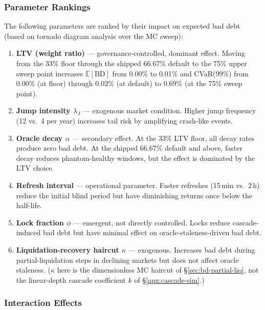 \documentclass[10pt,a4paper,twocolumn]{article}
\begin{document}
\subsubsection{Parameter Rankings}
\label{subsec:bd-tornado}

The following parameters are ranked by their impact on expected bad debt (based on tornado diagram analysis over the MC sweep):

\begin{enumerate}[leftmargin=*]
\item \textbf{LTV (weight ratio)} --- governance-controlled, dominant effect. Moving from the 33\% floor through the shipped 66.67\% default to the 75\% upper sweep point increases $\mathbb{E}[\text{BD}]$ from 0.00\% to 0.01\% and CVaR(99\%) from 0.00\% (at floor) through 0.02\% (at default) to 0.69\% (at the 75\% sweep point).

\item \textbf{Jump intensity $\lambda_J$} --- exogenous market condition. Higher jump frequency (12 vs.\ 4 per year) increases tail risk by amplifying crash-like events.

\item \textbf{Oracle decay $\alpha$} --- secondary effect. At the 33\% LTV floor, all decay rates produce zero bad debt. At the shipped 66.67\% default and above, faster decay reduces phantom-healthy windows, but the effect is dominated by the LTV choice.

\item \textbf{Refresh interval} --- operational parameter. Faster refreshes (15\,min vs.\ 2\,h) reduce the initial blind period but have diminishing returns once below the half-life.

\item \textbf{Lock fraction $\phi$} --- emergent, not directly controlled. Locks reduce cascade-induced bad debt but have minimal effect on oracle-staleness-driven bad debt.

\item \textbf{Liquidation-recovery haircut $\kappa$} --- exogenous. Increases bad debt during partial-liquidation steps in declining markets but does not affect oracle staleness. ($\kappa$ here is the dimensionless MC haircut of \S\ref{sec:bd-partial-liq}, not the linear-depth cascade coefficient $k$ of \S\ref{apx:cascade-sim}.)
\end{enumerate}

\subsubsection{Interaction Effects}
\label{subsec:bd-interactions}
\end{document}
